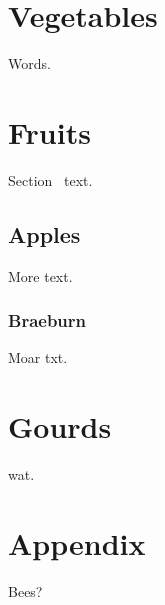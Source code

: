 \documentclass{article}
\begin{document}
\section{Vegetables}
Words.
\section{Fruits}
Section \thesection\ text. 
\subsection{Apples}
More text.
\subsubsection{Braeburn}
Moar txt. 
\section{Gourds}
wat.
\section*{Appendix}
Bees?
\end{document}
